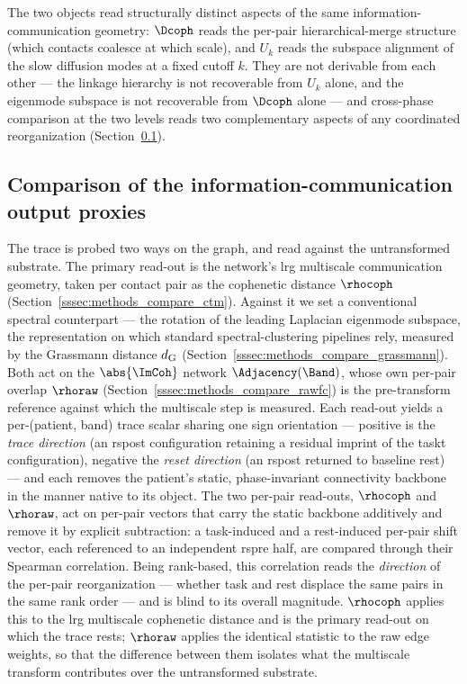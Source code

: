 The two objects read structurally distinct aspects of the same information-communication geometry: \(\Dcoph\) reads the per-pair hierarchical-merge structure (which contacts coalesce at which scale), and \(U_{k}\) reads the subspace alignment of the slow diffusion modes at a fixed cutoff \(k\). They are not derivable from each other --- the linkage hierarchy is not recoverable from \(U_{k}\) alone, and the eigenmode subspace is not recoverable from \(\Dcoph\) alone --- and cross-phase comparison at the two levels reads two complementary aspects of any coordinated reorganization (Section~\ref{ssec:methods_compare}).
%
\subsection{Comparison of the  information-communication output proxies}
    \label{ssec:methods_compare}
%
The trace is probed two ways on the graph, and read against the untransformed substrate. The primary read-out is the network's \gls{lrg} multiscale communication geometry, taken per contact pair as the cophenetic distance \(\rhocoph\) (Section~\ref{sssec:methods_compare_ctm}). Against it we set a conventional spectral counterpart --- the rotation of the leading Laplacian eigenmode subspace, the representation on which standard spectral-clustering pipelines rely, measured by the Grassmann distance \(d_{\rm G}\) (Section~\ref{sssec:methods_compare_grassmann}). Both act on the \(\abs{\ImCoh}\) network \(\Adjacency(\Band)\), whose own per-pair overlap \(\rhoraw\) (Section~\ref{sssec:methods_compare_rawfc}) is the pre-transform reference against which the multiscale step is measured. Each read-out yields a per-(patient, band) trace scalar sharing one sign orientation --- positive is the \emph{trace direction} (an \acrshort{rspost} configuration retaining a residual imprint of the \acrshort{taskt} configuration), negative the \emph{reset direction} (an \acrshort{rspost} returned to baseline rest) --- and each removes the patient's static, phase-invariant connectivity backbone in the manner native to its object.
%
The two per-pair read-outs, \(\rhocoph\) and \(\rhoraw\), act on per-pair vectors that carry the static backbone additively and remove it by explicit subtraction: a task-induced and a rest-induced per-pair shift vector, each referenced to an independent \acrshort{rspre} half, are compared through their Spearman correlation. Being rank-based, this correlation reads the \emph{direction} of the per-pair reorganization --- whether task and rest displace the same pairs in the same rank order --- and is blind to its overall magnitude. \(\rhocoph\) applies this to the \gls{lrg} multiscale cophenetic distance and is the primary read-out on which the trace rests; \(\rhoraw\) applies the identical statistic to the raw edge weights, so that the difference between them isolates what the multiscale transform contributes over the untransformed substrate.
